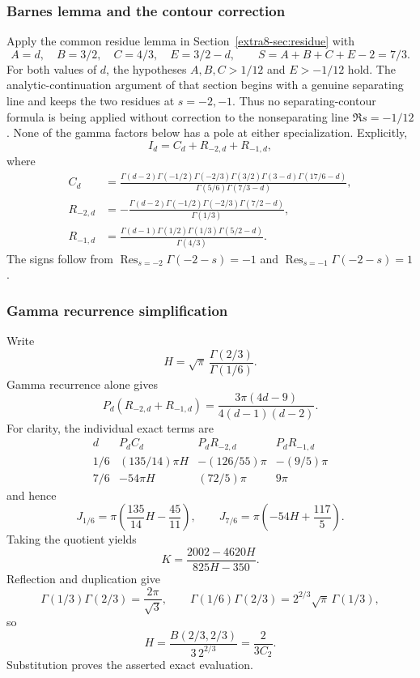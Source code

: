 \documentclass[11pt,a4paper]{article}
\theoremstyle{definition}
\theoremstyle{remark}
\numberwithin{equation}{section}
\begin{document}
\subsubsection*{Barnes lemma and the contour correction}
Apply the common residue lemma in Section~\ref{extra8-sec:residue} with
\[
 A=d,\quad B=3/2,\quad C=4/3,\quad E=3/2-d,
 \qquad S=A+B+C+E-2=7/3.
\]
For both values of $d$, the hypotheses $A,B,C>1/12$ and $E>-1/12$
hold.  The analytic-continuation argument of that section begins with
a genuine separating line and keeps the two residues at $s=-2,-1$.
Thus no separating-contour formula is being applied without correction
to the nonseparating line $\Re s=-1/12$.  None of the gamma factors below
has a pole at either specialization.  Explicitly,
\[
 I_d=C_d+R_{-2,d}+R_{-1,d},
\]
where
\begin{align*}
 C_d&=
 \frac{\Gamma(d-2)\Gamma(-1/2)\Gamma(-2/3)\Gamma(3/2)
       \Gamma(3-d)\Gamma(17/6-d)}
 {\Gamma(5/6)\Gamma(7/3-d)},\\
 R_{-2,d}&=-\frac{\Gamma(d-2)\Gamma(-1/2)\Gamma(-2/3)
                         \Gamma(7/2-d)}{\Gamma(1/3)},\\
 R_{-1,d}&=\frac{\Gamma(d-1)\Gamma(1/2)\Gamma(1/3)
                        \Gamma(5/2-d)}{\Gamma(4/3)}.
\end{align*}
The signs follow from
$\operatorname{Res}_{s=-2}\Gamma(-2-s)=-1$ and
$\operatorname{Res}_{s=-1}\Gamma(-2-s)=1$.

\subsubsection*{Gamma recurrence simplification}
Write
\[
 H=\sqrt\pi\,\frac{\Gamma(2/3)}{\Gamma(1/6)}.
\]
Gamma recurrence alone gives
\[
 P_d(R_{-2,d}+R_{-1,d})
 =\frac{3\pi(4d-9)}{4(d-1)(d-2)}.
\]
For clarity, the individual exact terms are
\[
\begin{array}{c|ccc}
 d&P_dC_d&P_dR_{-2,d}&P_dR_{-1,d}\\ \hline
 1/6&(135/14)\pi H&-(126/55)\pi&-(9/5)\pi\\
 7/6&-54\pi H&(72/5)\pi&9\pi
\end{array}
\]
and hence
\[
 J_{1/6}=\pi\left(\frac{135}{14}H-\frac{45}{11}\right),
 \qquad
 J_{7/6}=\pi\left(-54H+\frac{117}{5}\right).
\]
Taking the quotient yields
\[
 K=\frac{2002-4620H}{825H-350}.
\]
Reflection and duplication give
\[
 \Gamma(1/3)\Gamma(2/3)=\frac{2\pi}{\sqrt3},\qquad
 \Gamma(1/6)\Gamma(2/3)=2^{2/3}\sqrt\pi\,\Gamma(1/3),
\]
so
\[
 H=\frac{B(2/3,2/3)}{3\,2^{2/3}}
   =\frac{2}{3C_2}.
\]
Substitution proves the asserted exact evaluation.
\end{document}
